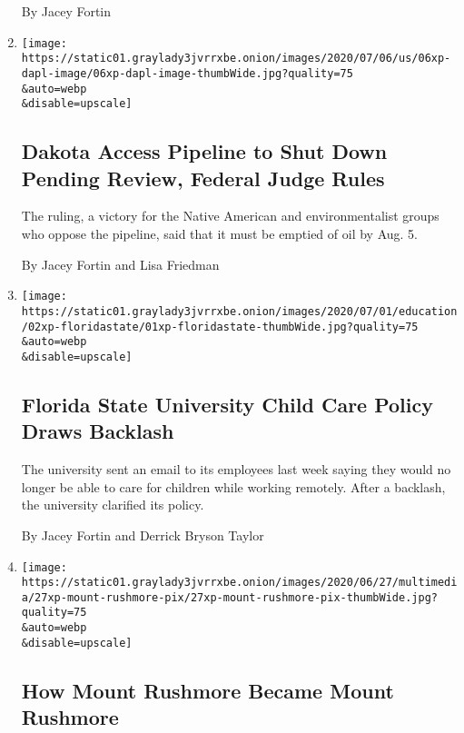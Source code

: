 \begin{enumerate}
  By Jacey Fortin
\item
  \href{/2020/07/06/us/dakota-access-pipeline.html}{}

  \texttt{[image: https://static01.graylady3jvrrxbe.onion/images/2020/07/06/us/06xp-dapl-image/06xp-dapl-image-thumbWide.jpg?quality=75\\\&auto=webp\\\&disable=upscale]}

  \hypertarget{dakota-access-pipeline-to-shut-down-pending-review-federal-judge-rules}{%
  \subsection{Dakota Access Pipeline to Shut Down Pending Review,
  Federal Judge
  Rules}\label{dakota-access-pipeline-to-shut-down-pending-review-federal-judge-rules}}

  The ruling, a victory for the Native American and environmentalist
  groups who oppose the pipeline, said that it must be emptied of oil by
  Aug. 5.

  By Jacey Fortin and Lisa Friedman
\item
  \href{/2020/07/02/us/fsu-telecommute-remote.html}{}

  \texttt{[image: https://static01.graylady3jvrrxbe.onion/images/2020/07/01/education/02xp-floridastate/01xp-floridastate-thumbWide.jpg?quality=75\\\&auto=webp\\\&disable=upscale]}

  \hypertarget{florida-state-university-child-care-policy-draws-backlash}{%
  \subsection{Florida State University Child Care Policy Draws
  Backlash}\label{florida-state-university-child-care-policy-draws-backlash}}

  The university sent an email to its employees last week saying they
  would no longer be able to care for children while working remotely.
  After a backlash, the university clarified its policy.

  By Jacey Fortin and Derrick Bryson Taylor
\item
  \href{/2020/07/01/us/mount-rushmore.html}{}

  \texttt{[image: https://static01.graylady3jvrrxbe.onion/images/2020/06/27/multimedia/27xp-mount-rushmore-pix/27xp-mount-rushmore-pix-thumbWide.jpg?quality=75\\\&auto=webp\\\&disable=upscale]}

  \hypertarget{how-mount-rushmore-became-mount-rushmore}{%
  \subsection{How Mount Rushmore Became Mount
  Rushmore}\label{how-mount-rushmore-became-mount-rushmore}}


\end{enumerate}
